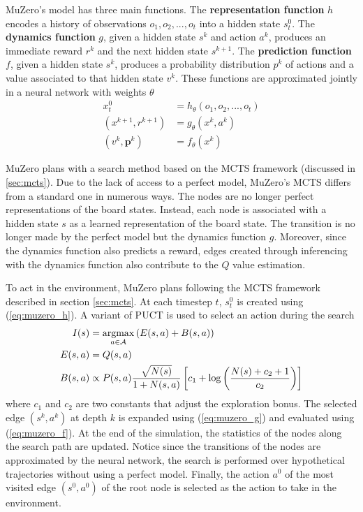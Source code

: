 MuZero's model has three main functions.
The \textbf{representation function} $h$ encodes a history of observations $o_1, o_2, ..., o_t$ into a hidden state $s_t^0$.
The \textbf{dynamics function} $g$,
given a hidden state $s^k$ and action $a^k$, produces an immediate reward $r^k$ and the next hidden state $s^{k+1}$.
The \textbf{prediction function} $f$,
given a hidden state $s^k$, produces a probability distribution $p^k$ of actions and a value associated to that hidden state $v^k$.
These functions are approximated jointly in a neural network with weights $\theta$
\begin{align}
    x^0_t               & = h_{\theta}(o_1, o_2, ..., o_t) \label{eq:muzero_h}  \\
    (x^{k+1}, r^{k+1})  & = g_{\theta}(x^k, a^k)  \label{eq:muzero_g}  \\
    (v^k, \pmb{p}^k)    & = f_{\theta}(x^k) \label{eq:muzero_f}
\end{align}

MuZero plans with a search method based on the MCTS framework (discussed in \ref{sec:mcts}).
Due to the lack of access to a perfect model, MuZero's MCTS differs from a standard one in numerous ways.
The nodes are no longer perfect representations of the board states.
Instead, each node is associated with a hidden state $s$ as a learned representation of the board state.
The transition is no longer made by the perfect model but the dynamics function $g$.
Moreover, since the dynamics function also predicts a reward, edges created through inferencing with the dynamics function also contribute to the $Q$ value estimation.

To act in the environment, MuZero plans following the MCTS framework described in section \ref{sec:mcts}.
At each timestep $t$, $s^0_t$ is created using (\ref{eq:muzero_h}).
A variant of PUCT is used to select an action during the search
\begin{align*}
    I(s)     & = \operatorname*{argmax}_{a \in \mathcal{A}} \left( E(s, a) + B(s, a) \right)  \\
    E(s, a)  & = Q(s, a)  \\
    B(s, a)  & \propto P(s, a) \frac{\sqrt{N(s)}}{1+N(s, a)}\left[c_{1}+\log \left(\frac{N(s)+c_{2}+1}{c_{2}}\right)\right]
\end{align*}
where $c_1$ and $c_2$ are two constants that adjust the exploration bonus.
The selected edge $(s^k, a^k)$ at depth $k$ is expanded using (\ref{eq:muzero_g}) and evaluated using (\ref{eq:muzero_f}).
At the end of the simulation, the statistics of the nodes along the search path are updated.
Notice since the transitions of the nodes are approximated by the neural network, the search is performed over hypothetical trajectories without using a perfect model.
Finally, the action $a^0$ of the most visited edge $(s^0, a^0)$ of the root node is selected as the action to take in the environment.


